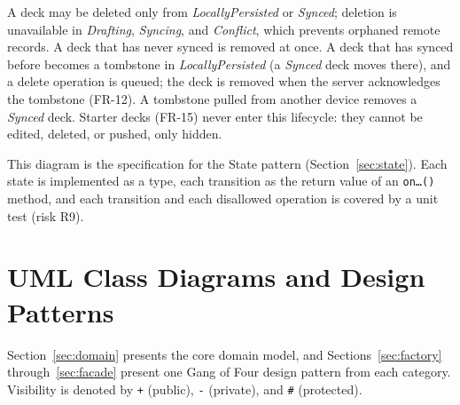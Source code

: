 \documentclass[12pt,letterpaper]{article}
\begin{document}
A deck may be deleted only from \emph{LocallyPersisted} or \emph{Synced}; deletion is
unavailable in \emph{Drafting}, \emph{Syncing}, and \emph{Conflict}, which prevents
orphaned remote records. A deck that has never synced is removed at once. A deck that
has synced before becomes a tombstone in \emph{LocallyPersisted} (a \emph{Synced} deck
moves there), and a delete operation is queued; the deck is removed when the server
acknowledges the tombstone (FR-12). A tombstone pulled from another device removes a
\emph{Synced} deck. Starter decks (FR-15) never enter this lifecycle: they cannot be
edited, deleted, or pushed, only hidden.

This diagram is the specification for the State pattern (Section~\ref{sec:state}).
Each state is implemented as a type, each transition as the return value of an
\texttt{on\ldots()} method, and each transition and each disallowed operation is
covered by a unit test (risk R9).

\section{UML Class Diagrams and Design Patterns}
Section~\ref{sec:domain} presents the core domain model, and
Sections~\ref{sec:factory} through~\ref{sec:facade} present one Gang of Four design
pattern from each category. Visibility is denoted by \texttt{+} (public), \texttt{-}
(private), and \texttt{\#} (protected).
\end{document}
